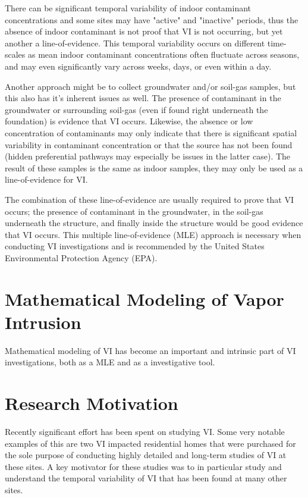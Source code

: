 \documentclass[../thesis.tex]{subfiles}
\begin{document}
There can be significant temporal variability of indoor contaminant concentrations and some sites may have "active" and "inactive" periods, thus the absence of indoor contaminant is not proof that VI is not occurring, but yet another a line-of-evidence.
This temporal variability occurs on different time-scales as mean indoor contaminant concentrations often fluctuate across seasons, and may even significantly vary across weeks, days, or even within a day.

Another approach might be to collect groundwater and/or soil-gas samples, but this also has it's inherent issues as well.
The presence of contaminant in the groundwater or surrounding soil-gas (even if found right underneath the foundation) is evidence that VI occurs.
Likewise, the absence or low concentration of contaminants may only indicate that there is significant spatial variability in contaminant concentration or that the source has not been found (hidden preferential pathways may especially be issues in the latter case).
The result of these samples is the same as indoor samples, they may only be used as a line-of-evidence for VI.

The combination of these line-of-evidence are usually required to prove that VI occurs; the presence of contaminant in the groundwater, in the soil-gas underneath the structure, and finally inside the structure would be good evidence that VI occurs.
This multiple line-of-evidence (MLE) approach is necessary when conducting VI investigations and is recommended by the United States Environmental Protection Agency (EPA).

\section{Mathematical Modeling of Vapor Intrusion}

Mathematical modeling of VI has become an important and intrinsic part of VI investigations, both as a MLE and as a investigative tool.

\section{Research Motivation}

Recently significant effort has been spent on studying VI.
Some very notable examples of this are two VI impacted residential homes that were purchased for the sole purpose of conducting highly detailed and long-term studies of VI at these sites.
A key motivator for these studies was to in particular study and understand the temporal variability of VI that has been found at many other sites.\par
\end{document}
